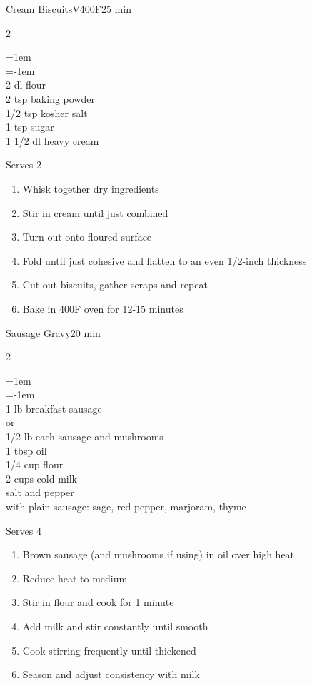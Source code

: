 \documentclass{article}
\newenvironment{recipe}[3][]
    {\begin{cardbase}[#1]{#2}{#3}
    \columnratio{0.333}
    \begin{paracol}{2}}
    {\end{paracol}\end{cardbase}}
\newcommand{\nextcolumn}{\switchcolumn}
\newenvironment{ingredients}
    {
    \begin{obeylines}
    \vspace{\parskip}
    \setlength{\parskip}{0.25em}
    \vspace{-0.25em}
    \leftskip=1em
    \parindent=-1em}
    {\end{obeylines}}
\newenvironment{steps}
    {\begin{enumerate}[leftmargin=*,topsep=0pt]}
    {\end{enumerate}}
\newcommand{\fahrenheit}[1]{#1\textdegree{}F}
\newcommand{\tag}[1]{\hspace{1em}#1}
\newcommand{\symboltag}[2]{\tag{#1\hspace{0.4em}#2}}
\newcommand{\totaltime}[1]{\symboltag{\raisebox{-0.1em}{\small\StopWatchEnd}}{#1}}
\newcommand{\preheat}[1]{\symboltag{\Topbottomheat}{#1}}
\begin{document}
\begin{recipe}{Cream Biscuits}{\tag{V}\preheat{\fahrenheit{400}}\totaltime{25 min}}
\begin{ingredients}
2 dl flour
2 tsp baking powder
1/2 tsp kosher salt
1 tsp sugar
1 1/2 dl heavy cream
\end{ingredients}
\nextcolumn
Serves 2
\begin{steps}
    \item Whisk together dry ingredients
    \item Stir in cream until just combined
    \item Turn out onto floured surface
    \item Fold until just cohesive and flatten to an even 1/2-inch thickness
    \item Cut out biscuits, gather scraps and repeat
    \item Bake in \fahrenheit{400} oven for 12-15 minutes
\end{steps}
\end{recipe}

\begin{recipe}{Sausage Gravy}{\totaltime{20 min}}
\begin{ingredients}
1 lb breakfast sausage
  or
1/2 lb each sausage and mushrooms
1 tbsp oil
1/4 cup flour
2 cups cold milk
salt and pepper
with plain sausage: sage, red pepper, marjoram, thyme
\end{ingredients}
\nextcolumn
Serves 4
\begin{steps}
    \item Brown sausage (and mushrooms if using) in oil over high heat
    \item Reduce heat to medium
    \item Stir in flour and cook for 1 minute
    \item Add milk and stir constantly until smooth
    \item Cook stirring frequently until thickened
    \item Season and adjust consistency with milk
\end{steps}
\end{recipe}
\end{document}
